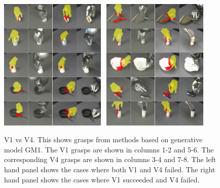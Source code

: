 \begin{figure}
\begin{center}
\includegraphics[width=0.45\textwidth]{plots/A2fA9f_vertical}~
\includegraphics[width=0.45\textwidth]{plots/A2sA9f_vertical}
\caption{V1 vs V4. This shows grasps from methods based on generative model GM1. The V1 grasps are shown in columns 1-2 and 5-6. The corresponding V4 grasps are shown in columns 3-4 and 7-8. The left hand panel shows the cases where both V1 and V4 failed. The right hand panel shows the cases where V1 succeeded and V4 failed. \label{fig:v1fsv4f}}
\end{center}
\end{figure}


%
